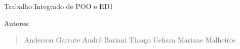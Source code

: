 Trabalho Integrado de P\+OO e E\+D1

Autores\+: \begin{quote}
Anderson Garrote André Bariani Thiago Uehara Mariane Malheiros\end{quote}
